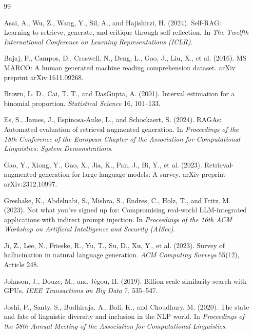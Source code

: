 \documentclass[10pt,a4paper]{article}
\begin{document}
\begin{thebibliography}{99}\small
\setlength{\itemsep}{2pt}

Asai, A., Wu, Z., Wang, Y., Sil, A., and Hajishirzi, H. (2024). Self-RAG: Learning to retrieve, generate, and critique through self-reflection. In \emph{The Twelfth International Conference on Learning Representations (ICLR)}.

Bajaj, P., Campos, D., Craswell, N., Deng, L., Gao, J., Liu, X., et al. (2016). MS MARCO: A human generated machine reading comprehension dataset. arXiv preprint arXiv:1611.09268.

Brown, L. D., Cai, T. T., and DasGupta, A. (2001). Interval estimation for a binomial proportion. \emph{Statistical Science} 16, 101--133.

Es, S., James, J., Espinosa-Anke, L., and Schockaert, S. (2024). RAGAs: Automated evaluation of retrieval augmented generation. In \emph{Proceedings of the 18th Conference of the European Chapter of the Association for Computational Linguistics: System Demonstrations}.

Gao, Y., Xiong, Y., Gao, X., Jia, K., Pan, J., Bi, Y., et al. (2023). Retrieval-augmented generation for large language models: A survey. arXiv preprint arXiv:2312.10997.

Greshake, K., Abdelnabi, S., Mishra, S., Endres, C., Holz, T., and Fritz, M. (2023). Not what you've signed up for: Compromising real-world LLM-integrated applications with indirect prompt injection. In \emph{Proceedings of the 16th ACM Workshop on Artificial Intelligence and Security (AISec)}.

Ji, Z., Lee, N., Frieske, R., Yu, T., Su, D., Xu, Y., et al. (2023). Survey of hallucination in natural language generation. \emph{ACM Computing Surveys} 55(12), Article 248.

Johnson, J., Douze, M., and J{\'e}gou, H. (2019). Billion-scale similarity search with GPUs. \emph{IEEE Transactions on Big Data} 7, 535--547.

Joshi, P., Santy, S., Budhiraja, A., Bali, K., and Choudhury, M. (2020). The state and fate of linguistic diversity and inclusion in the NLP world. In \emph{Proceedings of the 58th Annual Meeting of the Association for Computational Linguistics}.


\end{thebibliography}
\end{document}
